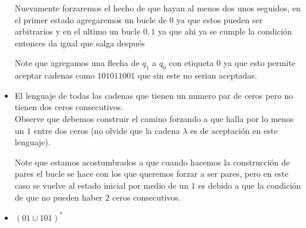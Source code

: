 \begin{itemize}[label={$\bullet$}]
         Nuevamente forzaremos el hecho de que hayan al menos dos unos seguidos, en el primer estado agregaremos un bucle de $0$ ya que estos pueden ser arbitrarios y en el ultimo un bucle $0,1$ ya que ahi ya se cumple la condición entonces da igual que salga después
        \begin{basedtikz}
        \centering
        \end{basedtikz}
        Note que agregamos una flecha de $q_1$ a $q_0$ con etiqueta $0$ ya que esto permite aceptar cadenas como $101011001$ que sin este no serian aceptadas.

        \item El lenguaje de todas las cadenas que tienen un numero par de ceros pero no tienen dos ceros consecutivos.\\

         Observe que debemos construir el camino forzando a que halla por lo menos un $1$ entre dos ceros (no olvide que la cadena $\lambda$ es de aceptación en este lenguaje).
        \begin{basedtikz}
        \centering
        \end{basedtikz}
        Note que estamos acostumbrados a que cuando hacemos la construcción de pares el bucle se hace con los que queremos forzar a ser pares, pero en este caso se vuelve al estado inicial por medio de un $1$ es debido a que la condición de que no pueden haber $2$ ceros consecutivos.
        \item $(01\cup101)^*$\\


\end{itemize}
